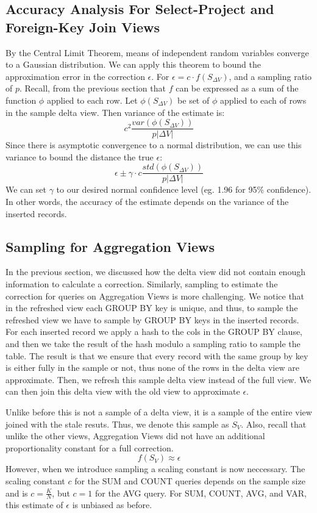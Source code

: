 \subsection{Accuracy Analysis For Select-Project and Foreign-Key Join Views}
By the Central Limit Theorem, means of independent random variables converge 
to a Gaussian distribution.
We can apply this theorem to bound the approximation error in the correction $\epsilon$.
For $\epsilon = c\cdot f(S_{\Delta V})$, and a sampling ratio of $p$.
Recall, from the previous section that $f$ can be expressed as a sum of the function $\phi$ applied to each row.
Let $\phi(S_{\Delta V})$ be set of $\phi$ applied to each of rows in the sample delta view.
Then variance of the estimate is:
\[
c^2\frac{var(\phi(S_{\Delta V}))}{p|\Delta V|}
\] 
Since there is asymptotic convergence to a normal distribution, we can use this variance to bound the distance the true $\epsilon$:   
\[
\epsilon \pm \gamma \cdot c\frac{std(\phi(S_{\Delta V}))}{p|\Delta V|}
\]
We can set $\gamma$ to our desired normal confidence level (eg. 1.96 for 95\% confidence).
In other words, the accuracy of the estimate depends on the variance of the inserted records.

\subsection{Sampling for Aggregation Views}
In the previous section, we discussed how the delta view did not contain enough
information to calculate a correction.
Similarly, sampling to estimate the correction for queries on Aggregation Views
is more challenging.
We notice that in the refreshed view each GROUP BY key is unique, and
thus, to sample the refreshed view we have to sample by GROUP BY keys
in the inserted records. For each inserted record we apply a hash
to the cols in the GROUP BY clause, and then we take the result of
the hash modulo a sampling ratio to sample the table. The result is
that we ensure that every record with the same group by key is either
fully in the sample or not, thus none of the rows in the delta view
are approximate. 
Then, we refresh this sample delta view instead of the full view.
We can then join this delta view with the old view to approximate $\epsilon$.

Unlike before this is not a sample of a delta view, it is a sample of the entire view joined with the stale resuts.
Thus, we denote this sample as $S_{V}$.
Also, recall that unlike the other views, Aggregation Views did not have 
an additional proportionality constant for a full correction.
\[
f(S_{V})\approx\epsilon
\]
However, when we introduce sampling a scaling constant is now neccessary.
The scaling constant $c$ for the SUM and COUNT queries depends on the sample size and is $c = \frac{K}{N}$, 
but $c = 1$ for the AVG query.
For SUM, COUNT, AVG, and VAR, this estimate of $\epsilon$ is unbiased as before.

